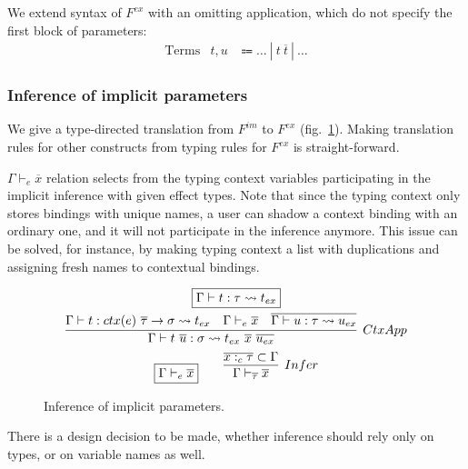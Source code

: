 \documentclass[acmsmall]{acmart}
\newcommand{\mathframebox}[1]{\framebox{$\displaystyle #1$}}
\newcommand{\vor}{~|~}
\newcommand{\ap}{~}
\newcommand{\ctx}[1]{ctx(#1)~}
\newcommand{\step}{\rightsquigarrow}
\begin{document}
We extend syntax of $F^{ex}$ with an omitting application, which do not specify the first block of parameters:
\[
    \begin{array}{lcc}
        \text{Terms} & t, u &\Coloneqq \ldots \vor t\ap\overline{t} \vor \ldots
    \end{array}
\]

\subsubsection{Inference of implicit parameters} \label{subsubsec:inference}

We give a type-directed translation from $F^{im}$ to $F^{ex}$ (fig.\ \ref{fig:fim-fex-inference}).
Making translation rules for other constructs from typing rules for $F^{ex}$ is straight-forward.

$\Gamma\vdash_e \overline{x}$ relation selects from the typing context variables participating in the implicit inference with given effect types.
Note that since the typing context only stores bindings with unique names, a user can shadow a context binding with an ordinary one, and it will not participate in the inference anymore.
This issue can be solved, for instance, by making typing context a list with duplications and assigning fresh names to contextual bindings.

\begin{figure}
    \begin{gather*}
        \mathframebox{\Gamma\vdash t : \tau \step t_{ex}} \\
        \infer[CtxApp]{
            \Gamma\vdash t\ap\overline{u} : \sigma \step t_{ex} \ap \overline{x}\ap\overline{u_{ex}}
        }{
            \Gamma\vdash t : \ctx{e} \overline{\tau} \to \sigma \step t_{ex} &
            \Gamma\vdash_e\overline{x} &
            \overline{\Gamma\vdash u : \tau \step u_{ex}}
        } \\
        \mathframebox{\Gamma\vdash_e \overline{x}}
        \text{\hspace{2em}}
        \infer[Infer]{\Gamma\vdash_{\overline{\tau}} \overline{x}}{\overline{x :_c \tau}\subset \Gamma}
    \end{gather*}
    \caption{Inference of implicit parameters.}
    \label{fig:fim-fex-inference}
\end{figure}

There is a design decision to be made, whether inference should rely only on types, or on variable names as well.
\end{document}
